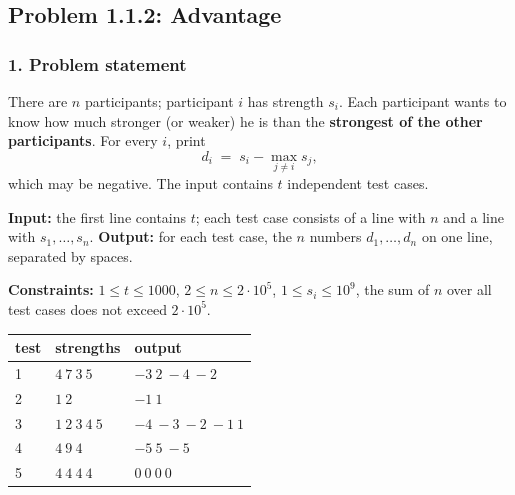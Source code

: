 \subsection{Problem 1.1.2: Advantage}


\subsubsection*{1. Problem statement}

There are $n$ participants; participant $i$ has strength $s_i$. Each participant wants to know how much stronger (or weaker) he is than the \textbf{strongest of the other participants}. For every $i$, print
\[
d_i \;=\; s_i - \max_{j \ne i} s_j ,
\]
which may be negative. The input contains $t$ independent test cases.

\textbf{Input:} the first line contains $t$; each test case consists of a line with $n$ and a line with $s_1, \dots, s_n$. \textbf{Output:} for each test case, the $n$ numbers $d_1, \dots, d_n$ on one line, separated by spaces.

\textbf{Constraints:} $1 \le t \le 1000$, \; $2 \le n \le 2\cdot10^5$, \; $1 \le s_i \le 10^9$, \; the sum of $n$ over all test cases does not exceed $2\cdot10^5$.

\begin{table}[H]
\centering\small
\begin{tabular}{@{}lll@{}}
\toprule
\textbf{test} & \textbf{strengths} & \textbf{output} \\
\midrule
1 & $4\ 7\ 3\ 5$ & $-3\ 2\ -4\ -2$ \\
2 & $1\ 2$ & $-1\ 1$ \\
3 & $1\ 2\ 3\ 4\ 5$ & $-4\ -3\ -2\ -1\ 1$ \\
4 & $4\ 9\ 4$ & $-5\ 5\ -5$ \\
5 & $4\ 4\ 4\ 4$ & $0\ 0\ 0\ 0$ \\
\bottomrule
\end{tabular}
\end{table}


